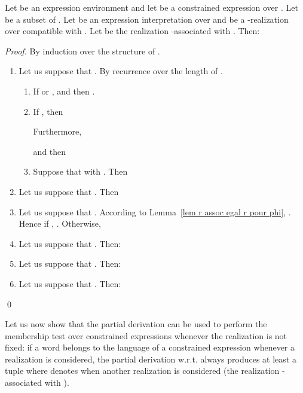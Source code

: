 \documentclass[a4paper]{llncs}
\begin{document}
  
  \begin{lemma}\label{lem r assoc egal r}
    Let  be an expression environment and let  be a constrained expression over . Let  be a subset of . Let  be an expression interpretation over  and  be a -realization over  compatible with . Let  be the realization -associated with . Then:
        
  \end{lemma}
  \begin{proof}
    By induction over the structure of .
    \begin{enumerate}
      \item Let us suppose that . 
        By recurrence over the length of .
        \begin{enumerate}
          \item If  or ,  and then .
          \item If , then           
        
              
              Furthermore, 
              
               
               and then 
               
               
              
          \item Suppose that  with .
                Then        
        
        \end{enumerate}
        
      \item Let us suppose that .
        Then    
        
        
      \item Let us suppose that .
        According to Lemma~\ref{lem r assoc egal r pour phi}, .
        Hence if , .
        Otherwise,
        
      \item Let us suppose that .
        Then:
        
        
      \item Let us suppose that .
        Then:
        
      \item Let us suppose that .
        Then:
        
    \end{enumerate}
    \qed
  \end{proof}
  
  Let us now show that the partial derivation can be used to perform the membership test over constrained expressions whenever the realization is not fixed: if a word  belongs to the language of a constrained expression  whenever a realization  is considered, the partial derivation w.r.t.  always produces at least a tuple  where  denotes  when another realization is considered (the realization -associated with ). 
  
\end{document}
